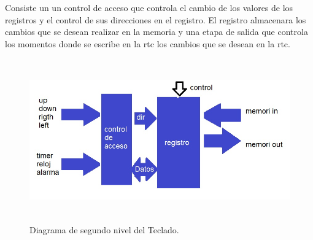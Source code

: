 \documentclass[12pt,a4paper]{article}
\begin{document}
		Consiste un un control de acceso que controla el cambio de los valores de los registros y el control de sus direcciones en el registro. El registro almacenara los cambios que se desean realizar en la memoria y una etapa de salida que controla los momentos donde se escribe en la rtc los cambios que se desean en la rtc.\\[2ex]
		
		
		\begin{figure}[htbp]
			\centering
			\includegraphics[height=7cm, width=16cm]{img/nivel2_contusr.jpg}
			\caption[1erNivel]{Diagrama de segundo nivel del Teclado.}
			\label{fig:SegundoNivelControlusr}
		\end{figure}
		
\end{document}
